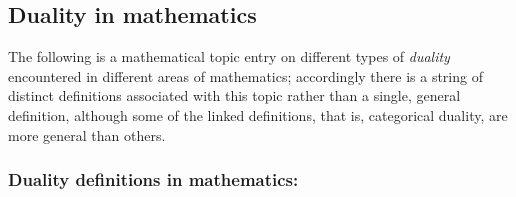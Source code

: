 \documentclass[12pt]{article}
\theoremstyle{plain}
\theoremstyle{definition}
\numberwithin{equation}{section}
\begin{document}
\subsection{Duality in mathematics}
  The following is a mathematical topic entry on different
types of \emph{duality} encountered in different areas of mathematics; accordingly there is
a string of distinct definitions associated with this topic rather than a single, general definition,
although some of the linked definitions, that is, categorical duality, are more general than others.

\subsubsection{Duality definitions in mathematics:}
\begin{enumerate}


\end{enumerate}
\end{document}

